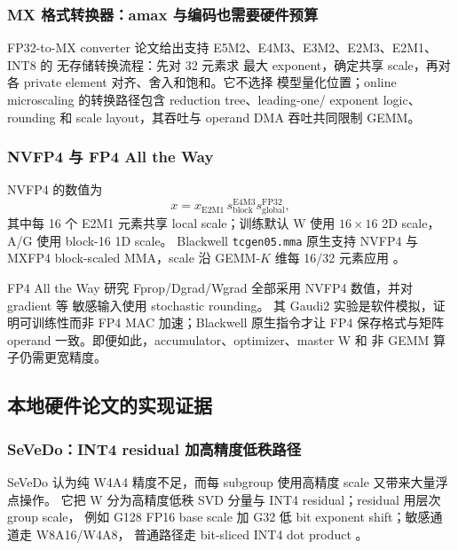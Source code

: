 \subsubsection{MX 格式转换器：amax 与编码也需要硬件预算}

FP32-to-MX converter 论文给出支持 E5M2、E4M3、E3M2、E2M3、E2M1、INT8 的
无存储转换流程：先对 32 元素求
最大 exponent，确定共享 scale，再对各 private element 对齐、舍入和饱和。它不选择
模型量化位置；online microscaling 的转换路径包含 reduction tree、leading-one/
exponent logic、rounding 和 scale layout，其吞吐与 operand DMA 吞吐共同限制 GEMM。

\subsubsection{NVFP4 与 FP4 All the Way}

NVFP4 的数值为
\begin{equation}
  x=x_{\mathrm{E2M1}}\,s_{\mathrm{block}}^{\mathrm{E4M3}}
    s_{\mathrm{global}}^{\mathrm{FP32}},
  \label{eq:nvfp4-value}
\end{equation}
其中每 16 个 E2M1 元素共享 local scale；训练默认 W 使用 $16\times16$ 2D scale，
A/G 使用 block-16 1D scale。
Blackwell \texttt{tcgen05.mma} 原生支持 NVFP4 与 MXFP4 block-scaled MMA，scale
沿 GEMM-$K$ 维每 16/32 元素应用
。

FP4 All the Way 研究 Fprop/Dgrad/Wgrad 全部采用 NVFP4 数值，并对 gradient 等
敏感输入使用 stochastic rounding。
其 Gaudi2 实验是软件模拟，证明可训练性而非 FP4 MAC 加速；Blackwell 原生指令才让
FP4 保存格式与矩阵 operand 一致。即便如此，accumulator、optimizer、master W 和
非 GEMM 算子仍需更宽精度。

\subsection{本地硬件论文的实现证据}

\subsubsection{SeVeDo：INT4 residual 加高精度低秩路径}

SeVeDo 认为纯 W4A4 精度不足，而每 subgroup 使用高精度 scale 又带来大量浮点操作。
它把 W 分为高精度低秩 SVD 分量与 INT4 residual；residual 用层次 group scale，
例如 G128 FP16 base scale 加 G32 低 bit exponent shift；敏感通道走 W8A16/W4A8，
普通路径走 bit-sliced INT4 dot product
。

